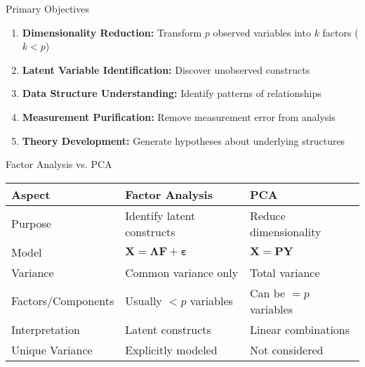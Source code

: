 \documentclass[aspectratio=169]{beamer}
\begin{document}
\begin{frame}{Primary Objectives}
  \begin{enumerate}
    \item \textbf{Dimensionality Reduction:} Transform $p$ observed variables into $k$ factors ($k < p$)
    \item \textbf{Latent Variable Identification:} Discover unobserved constructs
    \item \textbf{Data Structure Understanding:} Identify patterns of relationships
    \item \textbf{Measurement Purification:} Remove measurement error from analysis
    \item \textbf{Theory Development:} Generate hypotheses about underlying structures
  \end{enumerate}
\end{frame}

\begin{frame}{Factor Analysis vs. PCA}
  \begin{table}[h]
  \centering
  \scriptsize
  \begin{tabular}{@{}lll@{}}
  \toprule
  \textbf{Aspect} & \textbf{Factor Analysis} & \textbf{PCA} \\
  \midrule
  Purpose & Identify latent constructs & Reduce dimensionality \\
  Model & $\mathbf{X} = \boldsymbol{\Lambda}\mathbf{F} + \boldsymbol{\varepsilon}$ & $\mathbf{X} = \mathbf{PY}$ \\
  Variance & Common variance only & Total variance \\
  Factors/Components & Usually $< p$ variables & Can be $= p$ variables \\
  Interpretation & Latent constructs & Linear combinations \\
  Unique Variance & Explicitly modeled & Not considered \\
  \bottomrule
  \end{tabular}
  \end{table}
\end{frame}
\end{document}
